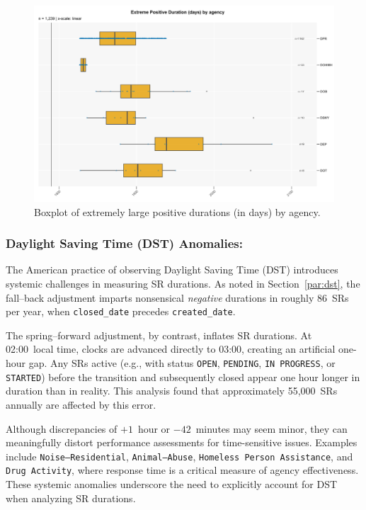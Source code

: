 \documentclass[linenumber]{jdsart}
\begin{document}
\begin{figure}[tbp]
  \centering
  \includegraphics[width=\textwidth]{boxplot_extreme_positive_days_by_agency.pdf}
  \caption{Boxplot of extremely large positive durations (in days) by agency.}
  \label{fig:extreme-positive-boxplot}
\end{figure}


\subsubsection{Daylight Saving Time (DST) Anomalies:}
\label{subsubsec:dst}
The American practice of observing Daylight Saving Time (DST) 
introduces systemic challenges in measuring 
\textsc{SR} durations. 
As noted in Section~\ref{par:dst}, the fall--back adjustment 
imparts nonsensical \emph{negative} durations in roughly 
86~\textsc{SR}s per year, when \texttt{closed\_date} 
precedes \texttt{created\_date}.  

The spring--forward adjustment, by contrast, inflates 
\textsc{SR} durations. At 02{:}00~local time, clocks are 
advanced directly to 03{:}00, creating an artificial one-hour gap. 
Any \textsc{SR}s active (e.g., with status 
\texttt{OPEN}, \texttt{PENDING}, \texttt{IN~PROGRESS}, or 
\texttt{STARTED}) before the transition and subsequently closed 
appear one hour longer in duration than in reality. 
This analysis found that approximately 55{,}000~\textsc{SR}s 
annually are affected by this error.  

Although discrepancies of $+1$~hour or $-42$~minutes may seem minor, 
they can meaningfully distort performance assessments for 
time-sensitive issues. Examples include 
\texttt{Noise--Residential}, \texttt{Animal--Abuse}, 
\texttt{Homeless~Person~Assistance}, and 
\texttt{Drug~Activity}, where response time is a critical measure 
of agency effectiveness. 
These systemic anomalies underscore the need to explicitly account 
for DST when analyzing \textsc{SR} durations.
\end{document}
